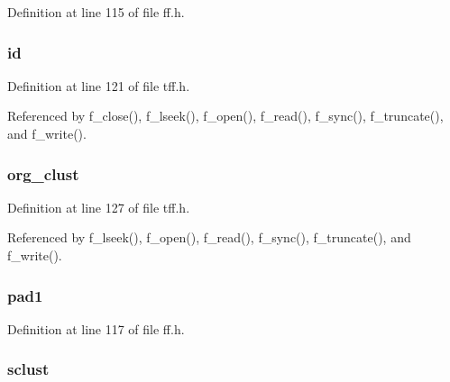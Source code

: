 Definition at line 115 of file ff.\-h.

\hypertarget{struct_f_i_l_a588688f55d57bf8a7e8c1d2cf88a3c56}{
\subsubsection[{id}]{ id}}\label{struct_f_i_l_a588688f55d57bf8a7e8c1d2cf88a3c56}


Definition at line 121 of file tff.\-h.



Referenced by f\-\_\-close(), f\-\_\-lseek(), f\-\_\-open(), f\-\_\-read(), f\-\_\-sync(), f\-\_\-truncate(), and f\-\_\-write().

\hypertarget{struct_f_i_l_a5203f761bacf25758b7e736215f74349}{
\subsubsection[{org\-\_\-clust}]{ org\-\_\-clust}}\label{struct_f_i_l_a5203f761bacf25758b7e736215f74349}


Definition at line 127 of file tff.\-h.



Referenced by f\-\_\-lseek(), f\-\_\-open(), f\-\_\-read(), f\-\_\-sync(), f\-\_\-truncate(), and f\-\_\-write().

\hypertarget{struct_f_i_l_a9d0cd2f5e246e02de081ae39a8b321e9}{
\subsubsection[{pad1}]{ pad1}}\label{struct_f_i_l_a9d0cd2f5e246e02de081ae39a8b321e9}


Definition at line 117 of file ff.\-h.

\hypertarget{struct_f_i_l_ad5d52f3fde971d2a05ff777a6243c252}{
\subsubsection[{sclust}]{ sclust}}\label{struct_f_i_l_ad5d52f3fde971d2a05ff777a6243c252}


